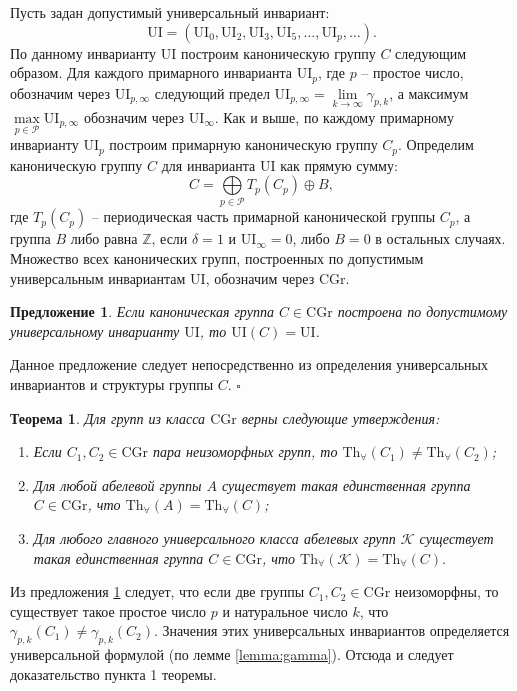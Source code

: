 \documentclass[a4paper,11pt,twoside]{article}
\newtheorem{theorem}{Теорема}[section]
\newtheorem{proposition}{Предложение}[section]
\def\proof{{\noindent{\bf Доказательство.}} }
\def\K{{\mathcal{K}}}
\def\P{{\mathcal{P}}}
\def\Z{{\mathbb{Z}}}
\def\Tha{{\mathrm{Th}_\forall}}
\def\CG{{\mathrm{CGr}}}
\def\ui{{\mathrm{UI}}}
\begin{document}
Пусть задан допустимый универсальный инвариант:
$$\ui = (\ui_0, \ui_2, \ui_3, \ui_5, \ldots, \ui_p, \ldots).$$ 
По данному инварианту $\ui$ построим каноническую группу $C$ следующим образом. Для каждого примарного инварианта $\ui_p$, где $p$ -- простое число, обозначим через $\ui_{p,\infty}$ следующий предел $\ui_{p,\infty} = \lim\limits_{k \rightarrow \infty} \gamma_{p,k}$, а максимум $\max\limits_{p \in \P} \ui_{p, \infty}$ обозначим через $\ui_\infty$. Как и выше, по каждому примарному инварианту $\ui_p$ построим примарную каноническую группу $C_p$. Определим каноническую группу $C$ для инварианта $\ui$ как прямую сумму:
$$C = \bigoplus\limits_{p \in \P} T_p(C_p) \oplus B,$$
где $T_p(C_p)$ -- периодическая часть примарной канонической группы $C_p$, а группа $B$ либо равна $\Z$, если $\delta = 1$ и $\ui_\infty = 0$, либо $B = 0$ в остальных случаях. Множество всех канонических групп, построенных по допустимым универсальным инвариантам $\ui$, обозначим через $\CG$.

\begin{proposition}\label{prop:UnivEnvForCannonicalGroup2}
Если каноническая группа $C \in \CG$ построена по допустимому универсальному инварианту $\ui$, то $\ui(C) = \ui$.
\end{proposition}
\proof Данное предложение следует непосредственно из определения универсальных инвариантов и структуры группы $C$. $\square$


\begin{theorem}\label{th:CannonicalGroupsAll}
Для групп из класса $\CG$ верны следующие утверждения:
\begin{enumerate}
\item Если $C_1, C_2 \in \CG$ пара неизоморфных групп, то $\Tha(C_1) \neq \Tha(C_2)$;
\item Для любой абелевой группы $A$ существует такая единственная группа $C \in \CG$, что $\Tha(A) = \Tha(C)$;
\item Для любого главного универсального класса абелевых групп $\K$ существует такая единственная группа $C \in \CG$, что $\Tha(\K) = \Tha(C).$
\end{enumerate}
\end{theorem}

\proof Из предложения \ref{prop:UnivEnvForCannonicalGroup2} следует, что если две группы $C_1, C_2 \in \CG$ неизоморфны, то существует такое простое число $p$ и натуральное число $k$, что $\gamma_{p,k}(C_1) \neq \gamma_{p,k}(C_2)$. Значения этих универсальных инвариантов определяется универсальной формулой (по лемме \ref{lemma:gamma}). Отсюда и следует доказательство пункта 1 теоремы.
\end{document}
